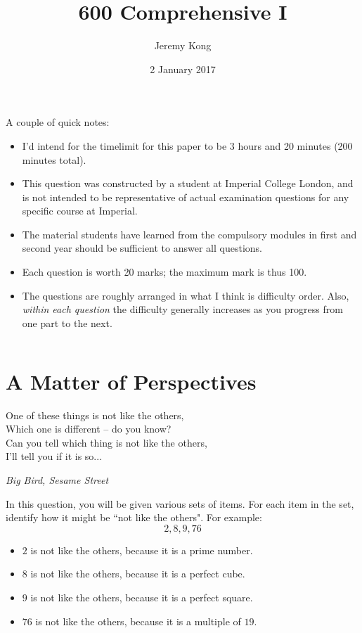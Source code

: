\documentclass[12pt, a4paper]{article}
\title{600 Comprehensive I}
\author{Jeremy Kong}
\date{2 January 2017}
\begin{document}
\maketitle

\noindent A couple of quick notes:
\begin{itemize}
\item I'd intend for the timelimit for this paper to be 3 hours and 20 minutes (200 minutes total).
\item This question was constructed by a student at Imperial College London, and is not intended to be representative of actual examination questions for any specific course at Imperial.
\item The material students have learned from the compulsory modules in first and second year should be sufficient to answer all questions.
\item Each question is worth 20 marks; the maximum mark is thus 100.
\item The questions are roughly arranged in what I think is difficulty order. Also, \textit{within each question} the difficulty generally increases as you progress from one part to the next.
\end{itemize}

\newpage
$\:$
\newpage 

\section{A Matter of Perspectives}
\epigraph{One of these things is not like the others, \\
Which one is different -- do you know? \\
Can you tell which thing is not like the others, \\
I'll tell you if it is so...
}{\textit{Big Bird, Sesame Street}}

\noindent In this question, you will be given various sets of items. For each item in the set, identify how it might be ``not like the others". For example:
$$
2, 8, 9, 76
$$

\begin{itemize}
\item $2$ is not like the others, because it is a prime number.
\item $8$ is not like the others, because it is a perfect cube.
\item $9$ is not like the others, because it is a perfect square.
\item $76$ is not like the others, because it is a multiple of $19$.
\end{itemize}
\end{document}
